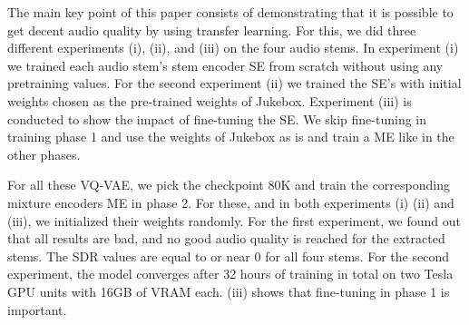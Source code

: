 \documentclass{llncs}
\begin{document}
\begin{table}[htb]
\centering
{}
\caption{Comparison of SDR values per stem and in total.  Our approach outperforms both the \textit{ScaledMixturePredictor}, the basic baseline in the Music Demixing Challenge \cite{musicDemixing} and \textit{Wave-U-Net} \cite{stoller2018waveunet}, a classic approach of source seperation in the waveform domain while \textit{Demucs}~\cite{DBLP:journals/corr/abs-1909-01174} achieves current SOTA performance on the Dataset.}
\label{tab:sdr_tab}
\end{table}





The main key point of this paper consists of demonstrating that it is
possible to get decent audio quality by using transfer learning. For
this, we did three different experiments (i), (ii), and (iii) on the four audio stems.
In experiment (i) we trained each audio stem's stem encoder SE from
scratch without using any pretraining values. For the second experiment
(ii) we trained the SE's with initial weights chosen as the pre-trained
weights of Jukebox. Experiment (iii) is conducted to show the impact of fine-tuning the SE. We skip fine-tuning in training phase 1 and use the weights of Jukebox as is and train a ME like in the other phases.






For all these VQ-VAE, we pick the checkpoint 80K and train the corresponding mixture encoders ME in phase 2. For
these, and in both experiments (i) (ii) and  (iii), we initialized their weights
randomly. For the first experiment, we found out that all results
are bad, and no good audio quality is reached for the extracted
stems. The SDR values are equal to or near 0 for all four stems. For
the  second  experiment,  the  model converges  after 32 hours of
training in total on two Tesla GPU units with 16GB of VRAM each. (iii) shows that fine-tuning in phase 1 is important.
\end{document}
